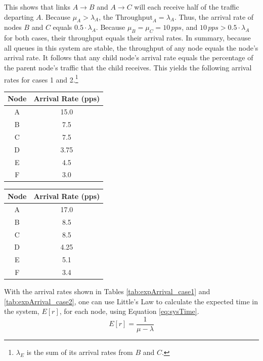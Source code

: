 \documentclass{article}
\begin{document}
This shows that links $A \rightarrow B$ and $A \rightarrow C$ will each receive half of the traffic departing $A$.
Because $\mu_A > \lambda_A$, the $\text{Throughput}_A = \lambda_A$.
Thus, the arrival rate of nodes $B$ and $C$ equals $0.5 \cdot \lambda_A$.
Because $\mu_B = \mu_C = 10 \, pps$, and $10 \, pps > 0.5 \cdot \lambda_A$ for both cases, their throughput equals their arrival rates.  
In summary, because all queues in this system are stable, the throughput of any node equals the node's arrival rate.
It follows that any child node's arrival rate equals the percentage of the parent node's traffic that the child receives.
This yields the following arrival rates for cases 1 and 2.\footnote{$\lambda_E$ is the sum of its arrival rates from $B$ and $C$.}
\newline

\begin{minipage}{0.5\textwidth}
\centering
\begin{tabular}{|c|c|} \hline
\textbf{Node} & \textbf{Arrival Rate (pps)} \\ \hline
A & 15.0 \\ \hline
B & 7.5 \\ \hline
C & 7.5 \\ \hline
D & 3.75 \\ \hline
E & 4.5 \\ \hline
F & 3.0 \\ \hline
\end{tabular}
\label{tab:expArrival_case1}
\end{minipage}
\begin{minipage}{0.5\textwidth}
\centering
\begin{tabular}{|c|c|} \hline
\textbf{Node} & \textbf{Arrival Rate (pps)} \\ \hline
A & 17.0 \\ \hline
B & 8.5 \\ \hline
C & 8.5 \\ \hline
D & 4.25 \\ \hline
E & 5.1 \\ \hline
F & 3.4 \\ \hline
\end{tabular}
\label{tab:expArrival_case2}
\end{minipage}
\newline

With the arrival rates shown in Tables \ref{tab:expArrival_case1} and \ref{tab:expArrival_case2}, one can use Little's Law to calculate the expected time in the system, $E[r]$, for each node, using Equation \ref{eq:sysTime}.  
\begin{equation}
E[r] = \frac{1}{\mu - \lambda}
\label{eq:sysTime}
\end{equation}
\end{document}
